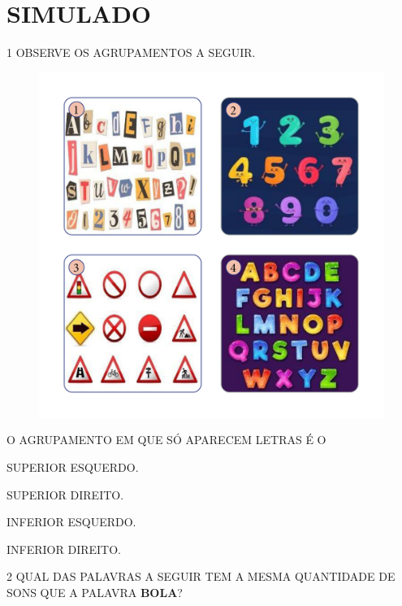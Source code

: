 \setcounter{chapter}{0}
\chapter[SIMULADO 1]{SIMULADO}

\num{1} OBSERVE OS AGRUPAMENTOS A SEGUIR.

\begin{figure}[H]
\includegraphics[width=\textwidth]{media/image183a186}
\end{figure}

O AGRUPAMENTO EM QUE SÓ APARECEM LETRAS É O

\begin{escolha}
\item SUPERIOR ESQUERDO.

\item SUPERIOR DIREITO.

\item INFERIOR ESQUERDO.

\item INFERIOR DIREITO.
\end{escolha}

\pagebreak

\num{2} QUAL DAS PALAVRAS A SEGUIR TEM A MESMA QUANTIDADE DE SONS QUE A PALAVRA \textbf{BOLA}?

